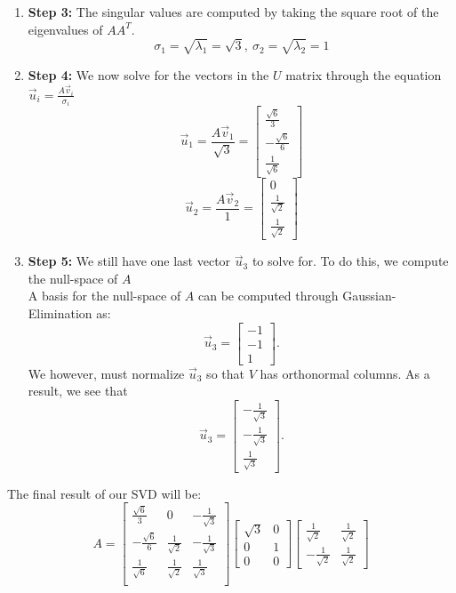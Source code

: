 \begin{enumerate}
{\begin{enumerate}[label=(\roman*)]
        Remember that these vectors form the $V$ matrix.
      \item \textbf{Step 3:}
        The singular values are computed by taking the square root of the eigenvalues of $AA^{T}.$
        $$\sigma_{1} = \sqrt{\lambda_{1}} = \sqrt{3}, \ \sigma_{2} = \sqrt{\lambda_{2}} = 1$$
      \item \textbf{Step 4:}
        We now solve for the vectors in the $U$ matrix through the equation $\vec{u}_i = \frac{A \vec{v}_i}{\sigma_i}$
        $$\vec{u}_{1} = \frac{A \vec{v}_{1}}{\sqrt{3}} =
        \begin{bmatrix} \frac{\sqrt{6}}{3} \\ -\frac{\sqrt{6}}{6} \\ \frac{1}{\sqrt{6}} \end{bmatrix}$$
        $$\vec{u}_{2} = \frac{A \vec{v}_{2}}{1} =
        \begin{bmatrix} 0 \\ \frac{1}{\sqrt{2}} \\ \frac{1}{\sqrt{2}} \end{bmatrix}$$
      \item \textbf{Step 5:}
        We still have one last vector $\vec{u}_{3}$ to solve for. To do this, we compute the null-space of $A$ \\
        A basis for the null-space of $A$ can be computed through Gaussian-Elimination as:
        $$\vec{u}_{3} = \begin{bmatrix} -1 \\ -1 \\ 1 \end{bmatrix}.$$
        We however, must normalize $\vec{u}_{3}$ so that $V$ has orthonormal columns. As a result, we see that
        $$\vec{u}_{3} = \begin{bmatrix} -\frac{1}{\sqrt{3}} \\ -\frac{1}{\sqrt{3}} \\ \frac{1}{\sqrt{3}} \end{bmatrix}.$$
    \end{enumerate}
    The final result of our SVD will be:
    \begin{equation}
      A =
      \begin{bmatrix}
      \frac{\sqrt{6}}{3} & 0 & -\frac{1}{\sqrt{3}} \\
      -\frac{\sqrt{6}}{6} & \frac{1}{\sqrt{2}} & -\frac{1}{\sqrt{3}} \\
      \frac{1}{\sqrt{6}} & \frac{1}{\sqrt{2}} & \frac{1}{\sqrt{3}} \\ \end{bmatrix}
      \begin{bmatrix} \sqrt{3} & 0 \\ 0 & 1 \\ 0 & 0 \end{bmatrix}
      \begin{bmatrix}
      \frac{1}{\sqrt{2}} & \frac{1}{\sqrt{2}} \\
      -\frac{1}{\sqrt{2}} & \frac{1}{\sqrt{2}} \end{bmatrix}
    \end{equation}

}
\end{enumerate}
